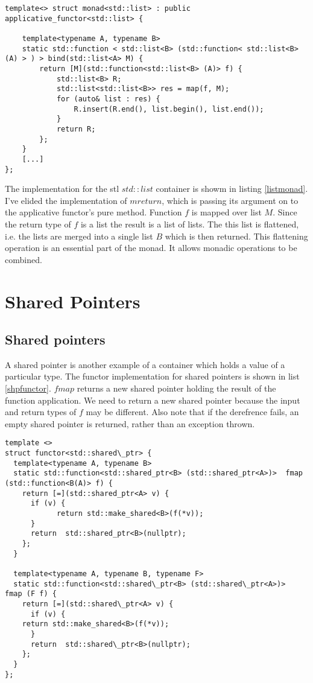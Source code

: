 \documentclass[12pt,fleqn]{article}
\begin{document}
\begin{lstlisting}[caption=monad for std::list, label=listmonad]
template<> struct monad<std::list> : public applicative_functor<std::list> {

	template<typename A, typename B>
	static std::function < std::list<B> (std::function< std::list<B> (A) > ) > bind(std::list<A> M) {
		return [M](std::function<std::list<B> (A)> f) {
			std::list<B> R;
			std::list<std::list<B>> res = map(f, M);
			for (auto& list : res) {
				R.insert(R.end(), list.begin(), list.end());
			}
			return R;
		};
	}
    [...]
};
\end{lstlisting}
The implementation for the stl $std::list$ container is showm in listing \ref{listmonad}.
I've elided the implementation of $mreturn$, which is passing its argument on to the applicative functor's pure method.
Function $f$ is mapped over list $M$. Since the return type of $f$ is a list the result is a list of lists.
The this list is flattened, i.e. the lists are merged into a single list $B$ which is then returned.
This flattening operation is an essential part of the monad. It allows monadic operations to be combined.

\section{Shared Pointers}

  

\subsection{Shared pointers}
%
%
%

A shared pointer is another example of a container which holds a value of a particular type.
The functor implementation for shared pointers is shown in list \ref{shpfunctor}. 
$fmap$ returns a new shared pointer holding the result of the function application.
We need to return a new shared pointer because the input and return types of $f$ may be different. 
Also note that if the derefrence fails, an empty shared pointer is returned, rather than an exception thrown.
\begin{lstlisting}[caption=shared pointer as container, label=shpfunctor]
template <>
struct functor<std::shared\_ptr> {
  template<typename A, typename B>
  static std::function<std::shared_ptr<B> (std::shared_ptr<A>)>  fmap (std::function<B(A)> f) {
    return [=](std::shared_ptr<A> v) {
      if (v) {
	        return std::make_shared<B>(f(*v)); 
      }
      return  std::shared_ptr<B>(nullptr);
    };
  }

  template<typename A, typename B, typename F>
  static std::function<std::shared\_ptr<B> (std::shared\_ptr<A>)>  fmap (F f) {
    return [=](std::shared\_ptr<A> v) {
      if (v) {
	return std::make_shared<B>(f(*v)); 
      }
      return  std::shared\_ptr<B>(nullptr);
    };
  }
};
\end{lstlisting}
\end{document}
